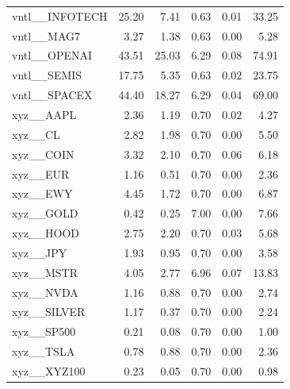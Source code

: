 \begin{table}[h]
\begin{tabular}{lrrrrr}
vntl__INFOTECH & 25.20 & 7.41 & 0.63 & 0.01 & 33.25 \\
vntl__MAG7 & 3.27 & 1.38 & 0.63 & 0.00 & 5.28 \\
vntl__OPENAI & 43.51 & 25.03 & 6.29 & 0.08 & 74.91 \\
vntl__SEMIS & 17.75 & 5.35 & 0.63 & 0.02 & 23.75 \\
vntl__SPACEX & 44.40 & 18.27 & 6.29 & 0.04 & 69.00 \\
xyz__AAPL & 2.36 & 1.19 & 0.70 & 0.02 & 4.27 \\
xyz__CL & 2.82 & 1.98 & 0.70 & 0.00 & 5.50 \\
xyz__COIN & 3.32 & 2.10 & 0.70 & 0.06 & 6.18 \\
xyz__EUR & 1.16 & 0.51 & 0.70 & 0.00 & 2.36 \\
xyz__EWY & 4.45 & 1.72 & 0.70 & 0.00 & 6.87 \\
xyz__GOLD & 0.42 & 0.25 & 7.00 & 0.00 & 7.66 \\
xyz__HOOD & 2.75 & 2.20 & 0.70 & 0.03 & 5.68 \\
xyz__JPY & 1.93 & 0.95 & 0.70 & 0.00 & 3.58 \\
xyz__MSTR & 4.05 & 2.77 & 6.96 & 0.07 & 13.83 \\
xyz__NVDA & 1.16 & 0.88 & 0.70 & 0.00 & 2.74 \\
xyz__SILVER & 1.17 & 0.37 & 0.70 & 0.00 & 2.24 \\
xyz__SP500 & 0.21 & 0.08 & 0.70 & 0.00 & 1.00 \\
xyz__TSLA & 0.78 & 0.88 & 0.70 & 0.00 & 2.36 \\
xyz__XYZ100 & 0.23 & 0.05 & 0.70 & 0.00 & 0.98 \\
\bottomrule
\end{tabular}
\end{table}